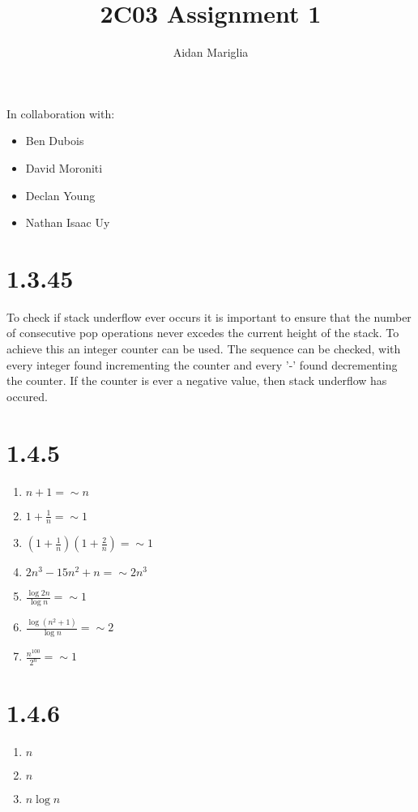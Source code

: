 \documentclass[12pt]{article}
\title{2C03 Assignment 1}
\author{Aidan Mariglia}
\begin{document}
\maketitle

In collaboration with:
\begin{itemize}[noitemsep]
  \item Ben Dubois
  \item David Moroniti
  \item Declan Young
  \item Nathan Isaac Uy
\end{itemize}

\section*{1.3.45}
  
To check if stack underflow ever occurs it is important to ensure that
the number of consecutive pop operations never excedes the current height
of the stack. To achieve this an integer counter can be used. The sequence
can be checked, with every integer found incrementing the counter and every
'-' found decrementing the counter. If the counter is ever a negative value,
then stack underflow has occured.

\section*{1.4.5}

\begin{enumerate}[label=(\alph*)]

  \item $n + 1 = \sim  n$
  \item $1 + \frac{1}{n} = \sim 1$
  \item $(1 + \frac{1}{n})(1 + \frac{2}{n}) = \sim 1$
  \item $2n^3 - 15n^2 + n  = \sim 2n^3$
  \item $\frac{\log 2n}{\log n} = \sim 1$
  \item $\frac{\log (n^2 + 1)}{\log n} = \sim 2$
  \item $\frac{n^{100}}{2^n} = \sim 1$

\end{enumerate}

\section*{1.4.6}

\begin{enumerate}[label = (\alph*)]
  \item $n$
  \item $n$
  \item $n\log{n}$

\end{enumerate}
\end{document}
